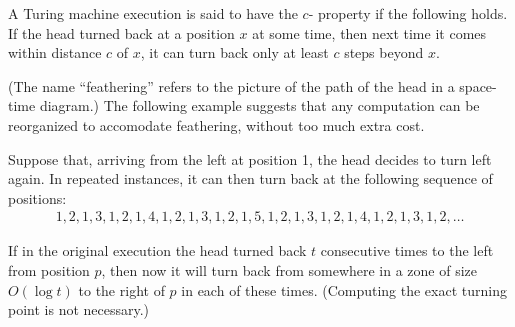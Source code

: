 \documentclass[11pt]{memoir}
\theoremstyle{definition} %
\begin{document}

\begin{definition}[Feathering]\label{def:feathering}
A Turing machine execution is said to have the \( c \)- property if the following holds.
If the head turned back at a position \( x \) at some time, then next time it comes within distance \( c \)
of \( x \), it can turn back only at least \( c \) steps beyond \( x \).
\end{definition}

(The name ``feathering'' refers to the picture of the path of the head in a space-time diagram.)
The following example suggests that any computation can be reorganized to accomodate feathering,
without too much extra cost.

\begin{example}[1-feathering]\label{xmp:feathering}
Suppose that, arriving from the left at position 1, the head decides to turn left again.
In repeated instances, it can then turn back at the following sequence of positions:
\begin{align*}
 1, 2, 1, 3, 1, 2, 1, 4, 1, 2, 1, 3, 1, 2, 1, 5, 1, 2, 1, 3, 1, 2, 1, 4, 1, 2, 1, 3, 1, 2, \dots
 \end{align*}
\end{example}

If in the original execution the head turned back \( t \) consecutive
times to the left from position \( p \), then now it will 
turn back from somewhere in a zone of size \( O(\log t) \) to the right of \( p \) in 
each of these times.
(Computing the exact turning point is not necessary.)
\end{document}
